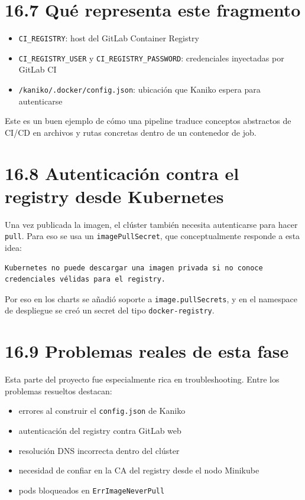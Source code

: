 \documentclass[
a4paper,
12pt]{report}
\providecommand{\tightlist}{%
  \setlength{\itemsep}{0pt}\setlength{\parskip}{0pt}}
\begin{document}
\section{16.7 Qué representa este
fragmento}\label{quuxe9-representa-este-fragmento}

\begin{itemize}
\tightlist
\item
  \texttt{CI\_REGISTRY}: host del GitLab Container Registry
\item
  \texttt{CI\_REGISTRY\_USER} y \texttt{CI\_REGISTRY\_PASSWORD}:
  credenciales inyectadas por GitLab CI
\item
  \texttt{/kaniko/.docker/config.json}: ubicación que Kaniko espera para
  autenticarse
\end{itemize}

Este es un buen ejemplo de cómo una pipeline traduce conceptos
abstractos de CI/CD en archivos y rutas concretas dentro de un
contenedor de job.

\section{16.8 Autenticación contra el registry desde
Kubernetes}\label{autenticaciuxf3n-contra-el-registry-desde-kubernetes}

Una vez publicada la imagen, el clúster también necesita autenticarse
para hacer \texttt{pull}. Para eso se usa un \texttt{imagePullSecret},
que conceptualmente responde a esta idea:

\begin{verbatim}
Kubernetes no puede descargar una imagen privada si no conoce credenciales vélidas para el registry.
\end{verbatim}

Por eso en los charts se añadió soporte a \texttt{image.pullSecrets}, y
en el namespace de despliegue se creó un secret del tipo
\texttt{docker-registry}.

\section{16.9 Problemas reales de esta
fase}\label{problemas-reales-de-esta-fase}

Esta parte del proyecto fue especialmente rica en troubleshooting. Entre
los problemas resueltos destacan:

\begin{itemize}
\tightlist
\item
  errores al construir el \texttt{config.json} de Kaniko
\item
  autenticación del registry contra GitLab web
\item
  resolución DNS incorrecta dentro del clúster
\item
  necesidad de confiar en la CA del registry desde el nodo Minikube
\item
  pods bloqueados en \texttt{ErrImageNeverPull}
\end{itemize}
\end{document}
